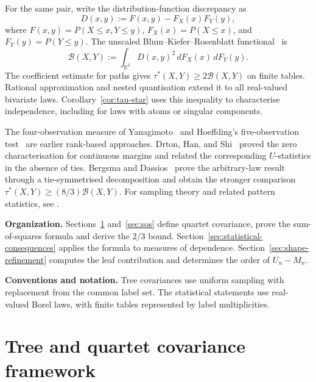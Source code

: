\documentclass[12pt]{article}
\begin{document}
For the same pair, write the distribution-function discrepancy as
\begin{equation}\label{eq:distribution-discrepancy}
D(x,y):=F(x,y)-F_X(x)\allowbreak F_Y(y),
\end{equation}
where
$F(x,y)=P(X\le x,Y\le y)$, $F_X(x)=P(X\le x)$, and
$F_Y(y)=P(Y\le y)$.  The unscaled Blum--Kiefer--Rosenblatt
functional~\cite{BlumKieferRosenblatt1961} is
\begin{equation}\label{eq:BKR-discrepancy}
\mathcal B(X,Y):=\int_{\mathbb R^2}D(x,y)^2\,dF_X(x)\,dF_Y(y).
\end{equation}
The coefficient estimate for paths gives $\tau^*(X,Y)\ge2\mathcal B(X,Y)$
on finite tables. Rational approximation and nested quantisation extend it
to all real-valued bivariate laws. Corollary~\ref{cor:tau-star} uses this
inequality to characterise independence, including for laws with atoms
or singular components.

The four-observation measure of Yanagimoto~\cite{Yanagimoto1970} and
Hoeffding's five-observation test~\cite{Hoeffding1948} are earlier
rank-based approaches. Drton, Han, and Shi~\cite{DrtonHanShi2020}
proved the zero characterisation for continuous margins and related
the corresponding $U$-statistics in the absence of ties.
Bergsma and Dassios~\cite{BergsmaDassios2026} prove the arbitrary-law
result through a tie-symmetrised decomposition and obtain the stronger
comparison $\tau^*(X,Y)\ge(8/3)\mathcal B(X,Y)$.
For sampling theory and related pattern statistics, see
\cite{NandyWeihsDrton2016,WeihsDrtonMeinshausen2018,BaringhausGruebel2026}.

\noindent\textbf{Organization.}
Sections~\ref{sec:tree-framework} and~\ref{sec:sos} define quartet covariance,
prove the sum-of-squares formula and derive the $2/3$ bound.
Section~\ref{sec:statistical-consequences} applies the formula to measures of
dependence. Section~\ref{sec:shape-refinement} computes the leaf contribution
and determines the order of $U_n-M_n$.

\noindent\textbf{Conventions and notation.}
Tree covariances use uniform sampling with replacement from the common
label set. The statistical statements use real-valued Borel laws, with
finite tables represented by label multiplicities.

\section{Tree and quartet covariance framework}
\label{sec:tree-framework}
\end{document}
